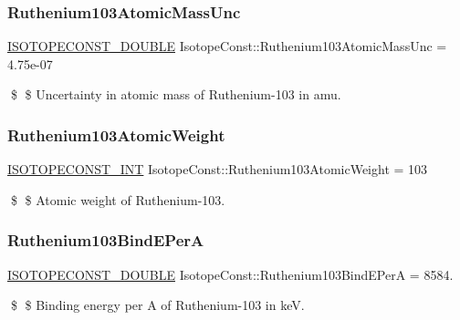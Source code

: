 \subsubsection{\texorpdfstring{Ruthenium103\+Atomic\+Mass\+Unc}{Ruthenium103AtomicMassUnc}}
{\footnotesize\ttfamily \mbox{\hyperlink{group___isotope_const-_macros_ga8f45a7272ce02c0b4c65c44636ed719a}{I\+S\+O\+T\+O\+P\+E\+C\+O\+N\+S\+T\+\_\+\+D\+O\+U\+B\+LE}} Isotope\+Const\+::\+Ruthenium103\+Atomic\+Mass\+Unc = 4.\+75e-\/07}

\$ \$ Uncertainty in atomic mass of Ruthenium-\/103 in amu. \mbox{\label{group___isotope_const-_ruthenium-_ru103_gab6d96ed6adda64ae4a37cb39aa914f9f}} 
\subsubsection{\texorpdfstring{Ruthenium103\+Atomic\+Weight}{Ruthenium103AtomicWeight}}
{\footnotesize\ttfamily \mbox{\hyperlink{group___isotope_const-_macros_ga5f18360b3e99483a35c32d789e62621c}{I\+S\+O\+T\+O\+P\+E\+C\+O\+N\+S\+T\+\_\+\+I\+NT}} Isotope\+Const\+::\+Ruthenium103\+Atomic\+Weight = 103}

\$ \$ Atomic weight of Ruthenium-\/103. \mbox{\label{group___isotope_const-_ruthenium-_ru103_ga166cca5d48213cb60bc133f4d451402d}} 
\subsubsection{\texorpdfstring{Ruthenium103\+Bind\+E\+PerA}{Ruthenium103BindEPerA}}
{\footnotesize\ttfamily \mbox{\hyperlink{group___isotope_const-_macros_ga8f45a7272ce02c0b4c65c44636ed719a}{I\+S\+O\+T\+O\+P\+E\+C\+O\+N\+S\+T\+\_\+\+D\+O\+U\+B\+LE}} Isotope\+Const\+::\+Ruthenium103\+Bind\+E\+PerA = 8584.}

\$ \$ Binding energy per A of Ruthenium-\/103 in keV. \mbox{\label{group___isotope_const-_ruthenium-_ru103_ga6a4aaf13ef4a94b00440cd0dc87e8a78}} 
